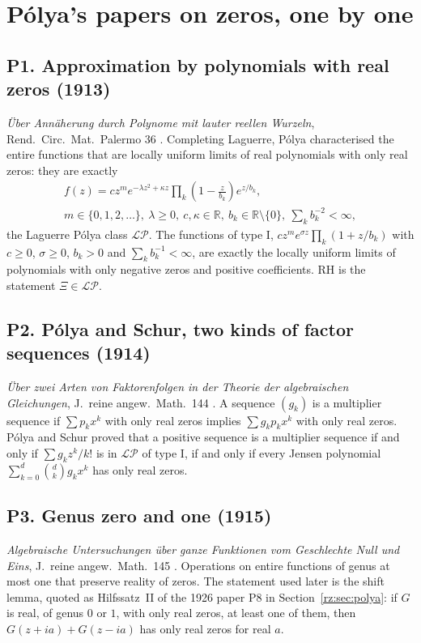 \section{P\'olya's papers on zeros, one by one}\label{pol:sec:papers}

\subsection*{P1. Approximation by polynomials with real zeros (1913)}
\emph{\"Uber Ann\"aherung durch Polynome mit lauter reellen Wurzeln}, Rend.\ Circ.\ Mat.\ Palermo 36 \cite{Polya13}. Completing Laguerre, P\'olya characterised the entire functions that are locally uniform limits of real polynomials with only real zeros: they are exactly
\begin{equation}\label{pol:eq:LP}
\begin{gathered}
f(z)=cz^me^{-\lambda z^2+\kappa z}\prod_k\left(1-\frac{z}{b_k}\right)e^{z/b_k},\\[4pt] m\in\{0,1,2,\dots\},\ \lambda\ge0,\ c,\kappa\in\mathbb R,\ b_k\in\mathbb R\setminus\{0\},\ \sum_kb_k^{-2}<\infty,
\end{gathered}
\end{equation}
the Laguerre P\'olya class $\mathcal{LP}$. The functions of type I, $cz^me^{\sigma z}\prod_k(1+z/b_k)$ with $c\ge0$, $\sigma\ge0$, $b_k>0$ and $\sum_kb_k^{-1}<\infty$, are exactly the locally uniform limits of polynomials with only negative zeros and positive coefficients. RH is the statement $\Xi\in\mathcal{LP}$.

\subsection*{P2. P\'olya and Schur, two kinds of factor sequences (1914)}
\emph{\"Uber zwei Arten von Faktorenfolgen in der Theorie der algebraischen Gleichungen}, J.\ reine angew.\ Math.\ 144 \cite{PS14}. A sequence $(g_k)$ is a multiplier sequence if $\sum p_kx^k$ with only real zeros implies $\sum g_kp_kx^k$ with only real zeros. P\'olya and Schur proved that a positive sequence is a multiplier sequence if and only if $\sum g_kz^k/k!$ is in $\mathcal{LP}$ of type I, if and only if every Jensen polynomial $\sum_{k=0}^d\binom dkg_kx^k$ has only real zeros.

\subsection*{P3. Genus zero and one (1915)}
\emph{Algebraische Untersuchungen \"uber ganze Funktionen vom Geschlechte Null und Eins}, J.\ reine angew.\ Math.\ 145 \cite{Polya15}. Operations on entire functions of genus at most one that preserve reality of zeros. The statement used later is the shift lemma, quoted as Hilfssatz~II of the 1926 paper P8 in Section~\ref{rz:sec:polya}: if $G$ is real, of genus $0$ or $1$, with only real zeros, at least one of them, then $G(z+ia)+G(z-ia)$ has only real zeros for real $a$.

